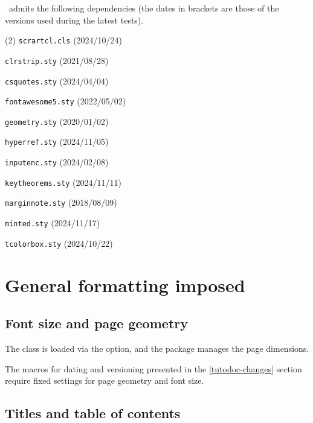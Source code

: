 \thisproj\ admits the following dependencies (the dates in brackets are those of the versions used during the latest tests).
%
\begin{tasks}[style=itemize](2)
    \task \texttt{scrartcl.cls}
    \hfill {\small (2024/10/24)}\kern10pt

    \task \texttt{clrstrip.sty}
    \hfill {\small (2021/08/28)}\kern10pt

    \task \texttt{csquotes.sty}
    \hfill {\small (2024/04/04)}\kern10pt

    \task \texttt{fontawesome5.sty}
    \hfill {\small (2022/05/02)}\kern10pt

    \task \texttt{geometry.sty}
    \hfill {\small (2020/01/02)}\kern10pt

    \task \texttt{hyperref.sty}
    \hfill {\small (2024/11/05)}\kern10pt

    \task \texttt{inputenc.sty}
    \hfill {\small (2024/02/08)}\kern10pt

    \task \texttt{keytheorems.sty}
    \hfill {\small (2024/11/11)}\kern10pt

    \task \texttt{marginnote.sty}
    \hfill {\small (2018/08/09)}\kern10pt

    \task \texttt{minted.sty}
    \hfill {\small (2024/11/17)}\kern10pt

    \task \texttt{tcolorbox.sty}
    \hfill {\small (2024/10/22)}\kern10pt
\end{tasks}


\section{General formatting imposed}

\subsection{Font size and page geometry}

The  class is loaded via the  option, and the  package manages the page dimensions.


\begin{tdocwarn}
	The macros for dating and versioning presented in the \ref{tutodoc-changes} section require fixed settings for page geometry and font size.
\end{tdocwarn}


\subsection{Titles and table of contents}

